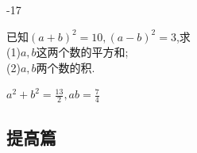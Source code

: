 \documentclass[cn,blue,12pt]{elegantbook}
\begin{document}
\begin{shiti}
\begin{shiti}[resume]
\begin{solution}
                -17\\
\end{solution}
        \item 已知\((a+b)^2=10,(a-b)^2=3\),求\\
            (1)\(a,b\)这两个数的平方和;\\
            (2)\(a,b\)两个数的积.\\
\begin{solution}
                \(a^2+b^2=\frac{13}{2}, ab=\frac{7}{4}\)\\
\end{solution}
        \end{shiti}
    \end{shiti}
    \subsection{提高篇}%
\end{document}
